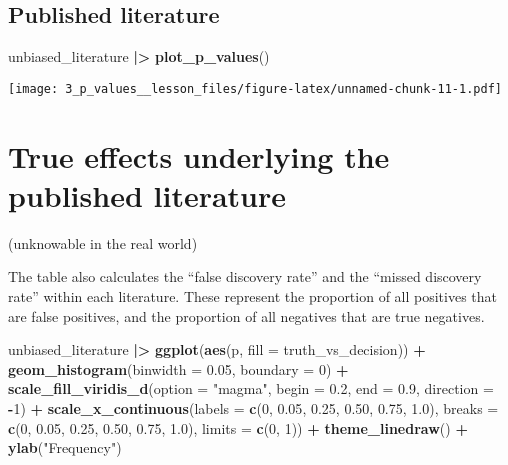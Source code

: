 \documentclass[
]{article}
\newenvironment{Shaded}{\begin{snugshade}}{\end{snugshade}}
\newcommand{\AttributeTok}[1]{\textcolor[rgb]{0.13,0.29,0.53}{#1}}
\newcommand{\DecValTok}[1]{\textcolor[rgb]{0.00,0.00,0.81}{#1}}
\newcommand{\FloatTok}[1]{\textcolor[rgb]{0.00,0.00,0.81}{#1}}
\newcommand{\FunctionTok}[1]{\textcolor[rgb]{0.13,0.29,0.53}{\textbf{#1}}}
\newcommand{\NormalTok}[1]{#1}
\newcommand{\SpecialCharTok}[1]{\textcolor[rgb]{0.81,0.36,0.00}{\textbf{#1}}}
\newcommand{\StringTok}[1]{\textcolor[rgb]{0.31,0.60,0.02}{#1}}
\begin{document}
\hypertarget{published-literature}{%
\subsection{Published literature}\label{published-literature}}

\begin{Shaded}
\begin{Highlighting}[]
\NormalTok{unbiased\_literature }\SpecialCharTok{|\textgreater{}}
  \FunctionTok{plot\_p\_values}\NormalTok{()}
\end{Highlighting}
\end{Shaded}

\texttt{[image: 3\_p\_values\_\_lesson\_files/figure-latex/unnamed-chunk-11-1.pdf]}

\hypertarget{true-effects-underlying-the-published-literature}{%
\section{True effects underlying the published
literature}\label{true-effects-underlying-the-published-literature}}

(unknowable in the real world)

The table also calculates the ``false discovery rate'' and the ``missed
discovery rate'' within each literature. These represent the proportion
of all positives that are false positives, and the proportion of all
negatives that are true negatives.

\begin{Shaded}
\begin{Highlighting}[]
\NormalTok{unbiased\_literature }\SpecialCharTok{|\textgreater{}}
  \FunctionTok{ggplot}\NormalTok{(}\FunctionTok{aes}\NormalTok{(p, }\AttributeTok{fill =}\NormalTok{ truth\_vs\_decision)) }\SpecialCharTok{+}
  \FunctionTok{geom\_histogram}\NormalTok{(}\AttributeTok{binwidth =} \FloatTok{0.05}\NormalTok{, }\AttributeTok{boundary =} \DecValTok{0}\NormalTok{) }\SpecialCharTok{+}
  \FunctionTok{scale\_fill\_viridis\_d}\NormalTok{(}\AttributeTok{option =} \StringTok{"magma"}\NormalTok{, }\AttributeTok{begin =} \FloatTok{0.2}\NormalTok{, }\AttributeTok{end =} \FloatTok{0.9}\NormalTok{, }\AttributeTok{direction =} \SpecialCharTok{{-}}\DecValTok{1}\NormalTok{) }\SpecialCharTok{+}
  \FunctionTok{scale\_x\_continuous}\NormalTok{(}\AttributeTok{labels =} \FunctionTok{c}\NormalTok{(}\DecValTok{0}\NormalTok{, }\FloatTok{0.05}\NormalTok{, }\FloatTok{0.25}\NormalTok{, }\FloatTok{0.50}\NormalTok{, }\FloatTok{0.75}\NormalTok{, }\FloatTok{1.0}\NormalTok{),}
                     \AttributeTok{breaks =} \FunctionTok{c}\NormalTok{(}\DecValTok{0}\NormalTok{, }\FloatTok{0.05}\NormalTok{, }\FloatTok{0.25}\NormalTok{, }\FloatTok{0.50}\NormalTok{, }\FloatTok{0.75}\NormalTok{, }\FloatTok{1.0}\NormalTok{), }
                     \AttributeTok{limits =} \FunctionTok{c}\NormalTok{(}\DecValTok{0}\NormalTok{, }\DecValTok{1}\NormalTok{)) }\SpecialCharTok{+}
  \FunctionTok{theme\_linedraw}\NormalTok{() }\SpecialCharTok{+}
  \FunctionTok{ylab}\NormalTok{(}\StringTok{"Frequency"}\NormalTok{)}
\end{Highlighting}
\end{Shaded}
\end{document}
